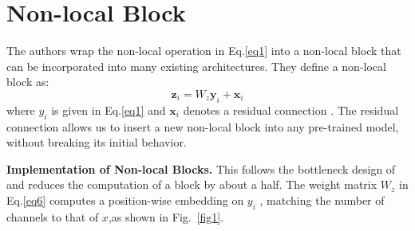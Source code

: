 \documentclass[10pt,twocolumn,letterpaper]{article}
\begin{document}
\section{Non-local Block}
The authors wrap the non-local operation in Eq.\ref{eq1} into a non-local
block that can be incorporated into many existing architectures. They define a non-local block as:
\begin{equation}
	\textbf{z}_i=W_z \textbf{y}_i +\textbf{x}_i
	\label{eq6}
\end{equation}
where $y_i$ is given in Eq.\ref{eq1} and $\textbf{x}_i$ denotes a residual
connection \cite{he2016deep}. The residual connection allows us to insert
a new non-local block into any pre-trained model, without
breaking its initial behavior.
\par
\noindent \textbf{Implementation of Non-local Blocks.} This follows the bottleneck
design of \cite{he2016deep} and reduces the computation of a block by
about a half. The weight matrix $W_z$ in Eq.\ref{eq6} computes a
position-wise embedding on $y_i$ , matching the number of
channels to that of $x$,as shown in Fig.~\ref{fig1}.


\end{document}

